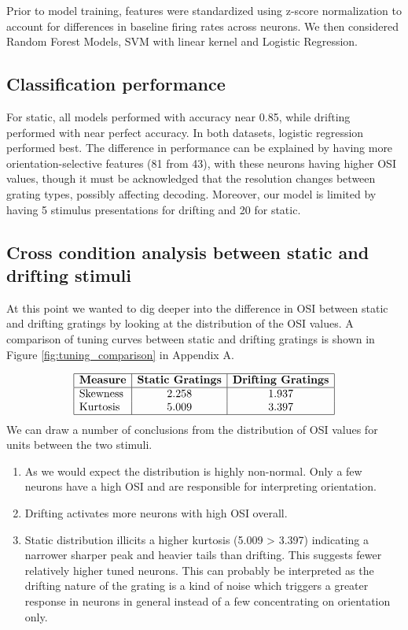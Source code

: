 \documentclass[10pt,twocolumn]{article}
\begin{document}
Prior to model training, features were standardized using z-score normalization to account for differences in baseline firing rates across neurons. We then considered Random Forest Models, SVM with linear kernel and Logistic Regression.

\subsection{Classification performance}

For static, all models performed with accuracy near 0.85, while drifting performed with near perfect accuracy. In both datasets, logistic regression performed best. The difference in performance can be explained by having more orientation-selective features (81 from 43), with these neurons having higher OSI values, though it must be acknowledged that the resolution changes between grating types, possibly affecting decoding. Moreover, our model is limited by having 5 stimulus presentations for drifting and 20 for static.

\subsection{Cross condition analysis between static and drifting stimuli}

At this point we wanted to dig deeper into the difference in OSI between static and drifting gratings by looking at the distribution of the OSI values. A comparison of tuning curves between static and drifting gratings is shown in Figure \ref{fig:tuning_comparison} in Appendix A.

\[
\begin{array}{|l|c|c|}
\hline
\textbf{Measure} & \textbf{Static Gratings} & \textbf{Drifting Gratings} \\
\hline
\text{Skewness} & 2.258 & 1.937 \\
\text{Kurtosis} & 5.009 & 3.397 \\
\hline
\end{array}
\]
We can draw a number of conclusions from the distribution of OSI values for units between the two stimuli.

\begin{enumerate}
    \item As we would expect the distribution is highly non-normal. Only a few neurons have a high OSI and are responsible for interpreting orientation.
    \item Drifting activates more neurons with high OSI overall.
    \item Static distribution illicits a higher kurtosis (5.009 > 3.397) indicating a narrower sharper peak and heavier tails than drifting. This suggests fewer relatively higher tuned neurons. This can probably be interpreted as the drifting nature of the grating is a kind of noise which triggers a greater response in neurons in general instead of a few concentrating on orientation only.
\end{enumerate}
\end{document}
